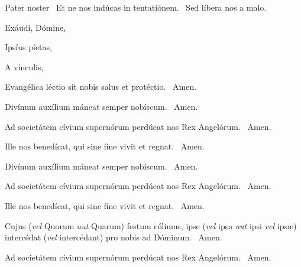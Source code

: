 Pater noster  \V\ Et ne nos indúcas in tentatiónem. \R\ Sed líbera nos a malo.



Exáudi, Dómine, 


Ipsíus píetas, 


A vínculis, 




 Evangélica léctio sit nobis salus et protéctio. \R\ Amen.

 Divínum auxílium máneat semper nobíscum. \R\ Amen.

 Ad societátem cívium supernórum perdúcat nos Rex Angelórum. \R\ Amen.


 Ille nos benedícat, qui sine fine vivit et regnat. \R\ Amen.

 Divínum auxílium máneat semper nobíscum. \R\ Amen.

 Ad societátem cívium supernórum perdúcat nos Rex Angelórum. \R\ Amen.


 Ille nos benedícat, qui sine fine vivit et regnat. \R\ Amen.

 Cujus (\textit{vel} Quorum \textit{aut} Quarum) festum cólimus, ipse (\textit{vel} ipsa \textit{aut} ipsi \textit{vel} ipsæ) intercédat (\textit{vel} intercédant) pro nobis ad Dóminum. \R\ Amen.

 Ad societátem cívium supernórum perdúcat nos Rex Angelórum. \R\ Amen.


